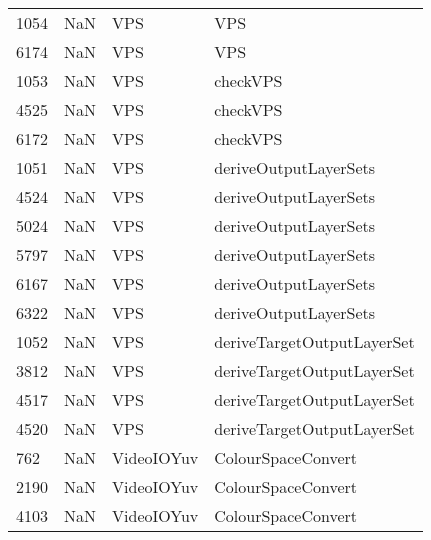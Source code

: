\begin{tabular}{llll}
1054 &                   NaN &                        VPS &                                       VPS \\
6174 &                   NaN &                        VPS &                                       VPS \\
1053 &                   NaN &                        VPS &                                  checkVPS \\
4525 &                   NaN &                        VPS &                                  checkVPS \\
6172 &                   NaN &                        VPS &                                  checkVPS \\
1051 &                   NaN &                        VPS &                     deriveOutputLayerSets \\
4524 &                   NaN &                        VPS &                     deriveOutputLayerSets \\
5024 &                   NaN &                        VPS &                     deriveOutputLayerSets \\
5797 &                   NaN &                        VPS &                     deriveOutputLayerSets \\
6167 &                   NaN &                        VPS &                     deriveOutputLayerSets \\
6322 &                   NaN &                        VPS &                     deriveOutputLayerSets \\
1052 &                   NaN &                        VPS &                deriveTargetOutputLayerSet \\
3812 &                   NaN &                        VPS &                deriveTargetOutputLayerSet \\
4517 &                   NaN &                        VPS &                deriveTargetOutputLayerSet \\
4520 &                   NaN &                        VPS &                deriveTargetOutputLayerSet \\
762  &                   NaN &                 VideoIOYuv &                        ColourSpaceConvert \\
2190 &                   NaN &                 VideoIOYuv &                        ColourSpaceConvert \\
4103 &                   NaN &                 VideoIOYuv &                        ColourSpaceConvert \\

\end{tabular}
